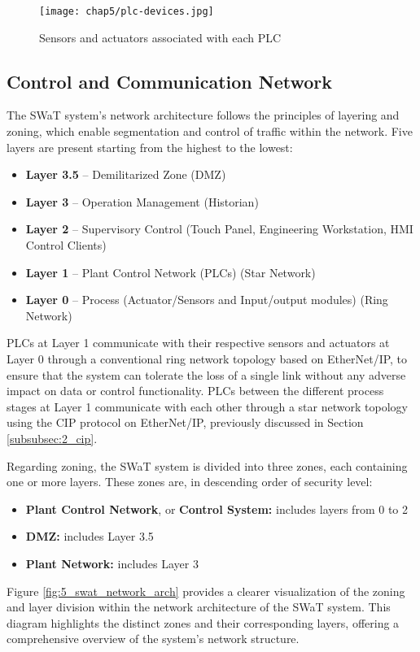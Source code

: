 \begin{figure}[ht]
	\centering
	\texttt{[image: chap5/plc-devices.jpg]}
	\caption{Sensors and actuators associated with each PLC}
	\label{fig:5_swat_sensors_plc}
\end{figure}

\subsection{Control and Communication Network}
\label{subsec:5_swat_network_architecture}
The SWaT system's network architecture follows the principles of layering and zoning, which enable segmentation and control of traffic within the network.
\newline \newline
Five layers are present starting from the highest to the lowest: 

\begin{itemize}
	\item \textbf{Layer 3.5} -- Demilitarized Zone (DMZ)
	\item \textbf{Layer 3} -- Operation Management (Historian)
	\item \textbf{Layer 2} -- Supervisory Control (Touch Panel, Engineering Workstation, HMI Control Clients)
	\item \textbf{Layer 1} -- Plant Control Network (PLCs) (Star Network)
	\item \textbf{Layer 0} -- Process (Actuator/Sensors and Input/output modules) (Ring Network)
\end{itemize}
PLCs at Layer 1 communicate with their respective sensors and actuators at Layer 0 through a conventional ring network topology based on EtherNet/IP, to ensure that the system can tolerate the loss of a single link without any adverse impact on data or control functionality.\newline
PLCs between the different process stages at Layer 1 communicate with each other through a star network topology using the CIP protocol on EtherNet/IP, previously discussed in Section \ref{subsubsec:2_cip}.

\bigskip
Regarding zoning, the SWaT system is divided into three zones, each containing one or more layers. These zones are, in descending order of security level: 

\begin{itemize}
	\item \textbf{Plant Control Network}, or \textbf{Control System:} includes layers from 0 to 2
	\item \textbf{DMZ:} includes Layer 3.5
	\item \textbf{Plant Network:} includes Layer 3
\end{itemize}
Figure \ref{fig:5_swat_network_arch} provides a clearer visualization of the zoning and layer division within the network architecture of the SWaT system. This diagram highlights the distinct zones and their corresponding layers, offering a comprehensive overview of the system's network structure.

